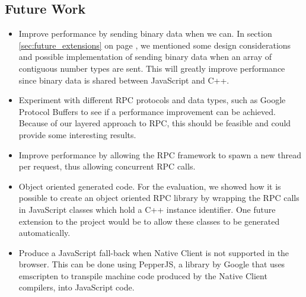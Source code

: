 \subsection{Future Work} %
\label{sub:future_work}
\begin{itemize}
	\item Improve performance by sending binary data when we can. In section \ref{sec:future_extensions} on page \pageref{sec:future_extensions}, we mentioned some design considerations and possible implementation of sending binary data when an array of contiguous number types are sent. This will greatly improve performance since binary data is shared between JavaScript and C++.
	\item Experiment with different RPC protocols and data types, such as Google Protocol Buffers to see if a performance improvement can be achieved. Because of our layered approach to RPC, this should be feasible and could provide some interesting results.
	\item Improve performance by allowing the RPC framework to spawn a new thread per request, thus allowing concurrent RPC calls.
	\item Object oriented generated code. For the evaluation, we showed how it is possible to create an object oriented RPC library by wrapping the RPC calls in JavaScript classes which hold a C++ instance identifier. One future extension to the project would be to allow these classes to be generated automatically.
	\item Produce a JavaScript fall-back when Native Client is not supported in the browser. This can be done using PepperJS\cite{pepperjs}, a library by Google that uses emscripten\cite{emscripten} to transpile machine code produced by the Native Client compilers, into JavaScript code.
\end{itemize}
